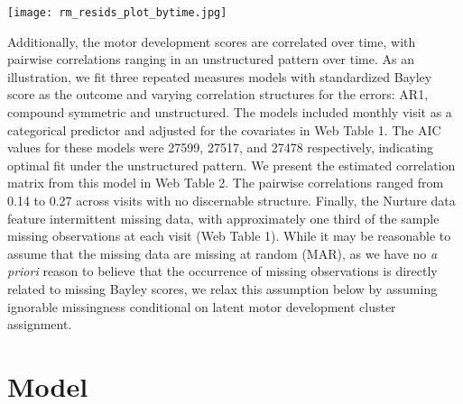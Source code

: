 \documentclass[useAMS,usenatbib,referee]{biom}
\let\origfigure\figure
\let\endorigfigure\endfigure
\renewenvironment{figure}[1][2] {
    \expandafter\origfigure\expandafter[H]
} {
    \endorigfigure
}
\begin{document}
\begin{figure}[h]
\caption{\label{fig:skew_resids} Scaled residual plots at each visit based on a repeated-measures linear regression model with Bayley score as the outcome. Sample skewness statistics and p-values from Shapiro-Wilk (SW) tests are provide in the legends. Plots are based on the $N=1769$ available measurements for $n=560$ infants.}
\texttt{[image: rm\_resids\_plot\_bytime.jpg]}
\end{figure}

Additionally, the motor development scores are correlated over time, with pairwise correlations ranging in an unstructured pattern over time. As an illustration, we fit three repeated measures models with standardized Bayley score as the outcome and varying correlation structures for the errors: AR1, compound symmetric and unstructured. The models included monthly visit as a categorical predictor and adjusted for the covariates in Web Table 1. The AIC values for these models were 27599, 27517, and 27478 respectively, indicating optimal fit under the unstructured pattern. We present the estimated correlation matrix from this model in {Web Table 2}. The pairwise correlations ranged from 0.14 to 0.27 across visits with no discernable structure. Finally, the Nurture data feature intermittent missing data, with approximately one third of the sample missing observations at each visit (Web Table 1). While it may be reasonable to assume that the missing data are missing at random (MAR), as we have no {\em a priori} reason to believe that the occurrence of missing observations is directly related to missing Bayley scores, we relax this assumption below by assuming ignorable missingness conditional on latent motor development cluster assignment.

\section{Model}
\label{s:model}
\end{document}

